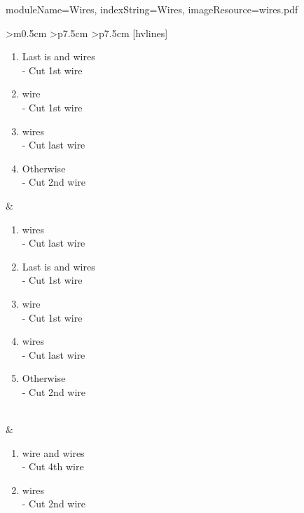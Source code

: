\documentclass{../../ktane-mod}
\begin{document}
\begin{module}{
  moduleName=Wires,
  indexString=Wires,
  imageResource=wires.pdf
}
\begin{NiceTabular}{
    >{\centering\arraybackslash}m{0.5cm}
    >{\centering\arraybackslash}p{7.5cm}
    >{\centering\arraybackslash}p{7.5cm}
  }[hvlines]
\begin{minipage}[c][5.1cm][t]{\linewidth}
\begin{enumerate}[label=\alph*.,itemsep=0pt]
                                  \item Last is \YELLOW and \RED[no RED] wires\\ - Cut 1st wire
                                  \item \BLUE[1 BLUE] wire\\ - Cut 1st wire
                                  \item \YELLOW[1+ YELLOW] wires\\ - Cut last wire
                                  \item Otherwise\\ - Cut 2nd wire
                                \end{enumerate}
    \end{minipage} & \begin{minipage}[c][5.1cm][t]{\linewidth}
                                                     \vspace*{0.1cm}
                       \begin{enumerate}[label=\alph*.,itemsep=0pt]
                         \item \RED[2+ RED] wires\\ - Cut last \RED wire
                         \item Last is \YELLOW and \RED[no RED] wires\\ - Cut 1st wire
                         \item \BLUE[1 BLUE] wire\\ - Cut 1st wire
                         \item \YELLOW[1+ YELLOW] wires\\ - Cut last wire
                         \item Otherwise\\ - Cut 2nd wire
                       \end{enumerate}
    \end{minipage} \\
     & \begin{minipage}[c][4cm][t]{\linewidth}
                                \vspace*{0.1cm}
                                \begin{enumerate}[label=\alph*.,itemsep=0pt]
                                  \item \RED[1 RED] wire and \YELLOW[2+ YELLOW] wires\\ - Cut 4th wire
                                  \item \BLACK[No BLACK] wires\\ - Cut 2nd wire

\end{enumerate}
\end{minipage}
\end{NiceTabular}
\end{module}
\end{document}
